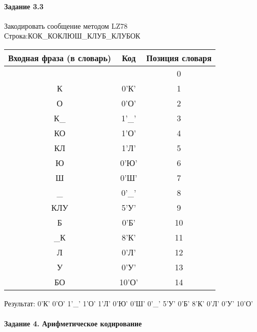\documentclass[a4paper, 12pt]{article}
\begin{document}
\paragraph{Задание 3.3}

Закодировать сообщение методом LZ78\\
Строка:КОК\_КОКЛЮШ\_КЛУБ\_КЛУБОК\\
\begin{table}[h!]
\centering
\begin{tabular}{|c|c|c|} 
\hline
 Входная фраза (в словарь) & Код & Позиция словаря \\ \hline

 &  & 0 \\ \hline
К & 0'К' & 1 \\ \hline
О & 0'О' & 2 \\ \hline
К\_ & 1'\_' & 3 \\ \hline
КО & 1'О' & 4 \\ \hline
КЛ & 1'Л' & 5 \\ \hline
Ю & 0'Ю' & 6 \\ \hline
Ш & 0'Ш' & 7 \\ \hline
\_ & 0'\_' & 8 \\ \hline
КЛУ & 5'У' & 9 \\ \hline
Б & 0'Б' & 10 \\ \hline
\_К & 8'К' & 11 \\ \hline
Л & 0'Л' & 12 \\ \hline
У & 0'У' & 13 \\ \hline
БО & 10'О' & 14 \\ \hline
\end{tabular}
\end{table}

Результат: 0'К' 0'О' 1'\_' 1'О' 1'Л' 0'Ю' 0'Ш' 0'\_' 5'У' 0'Б' 8'К' 0'Л' 0'У' 10'О'\\
\pagebreak
\paragraph{Задание 4. Арифметическое кодирование\\}
\end{document}
